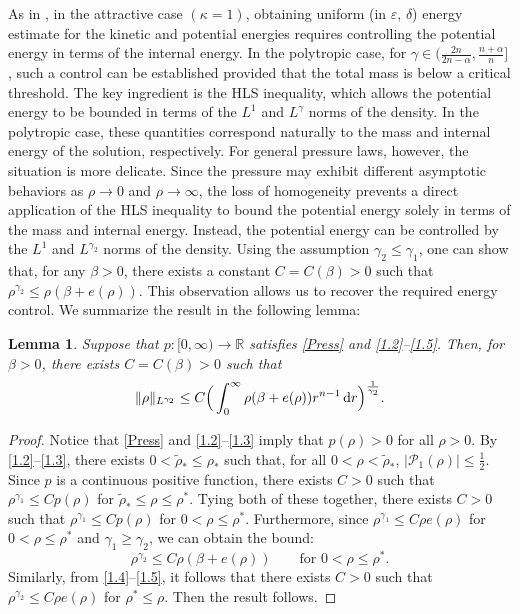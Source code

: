 \documentclass[reqno,11pt]{amsart}
\numberwithin{equation}{section}
\newtheorem{lemma}[theorem]{Lemma}
\theoremstyle{definition}
\def\dd{{\, \rm d}}
\begin{document}
As in \cite{Carrillo2025}, in the attractive case $(\kappa = 1)$, obtaining uniform (in $\varepsilon$, $\delta$) energy estimate for the kinetic and potential energies requires controlling the potential energy in terms of 
the internal energy. 
In the polytropic case, for $\gamma \in (\frac{2n}{2n -\alpha},\frac{n + \alpha}{n}]$, 
such a control can be established provided that the total mass is below a critical threshold.
The key ingredient is the HLS inequality, which allows the potential energy to be bounded in terms of the
$L^1$ and $L^\gamma$ norms of the density. 
In the polytropic case, these quantities correspond naturally to the mass and internal energy of the solution, respectively. 
For general pressure laws, however, the situation is more delicate.
Since the pressure may exhibit different asymptotic behaviors as $\rho \to 0$ and $\rho \to \infty$,
the loss of homogeneity prevents a direct application of the HLS inequality 
to bound the potential energy solely in terms of the mass and internal energy. 
Instead, the potential energy can be controlled by the $L^1$ and $L^{\gamma_2}$ norms of the density.
Using the assumption $\gamma_2\le \gamma_1$, one can show that, for any $\beta>0$, 
there exists a constant $C=C(\beta)>0$ such that $\rho^{\gamma_2} \leq \rho(\beta + e(\rho))$.
This observation allows us to recover the required energy control. 
We summarize the result in the following lemma:

\begin{lemma}\label{bigsmall}
Suppose that $p:[0,\infty) \to \mathbb{R}$ satisfies \eqref{Press} and \eqref{1.2}--\eqref{1.5}.
Then, for $\beta > 0$, there exists $C=C(\beta)>0$ such that
\begin{equation}\label{bigandsmallbehav}
\displaystyle
\| \rho \|_{L^{\gamma_2}} \leq C \Big ( \int^\infty_0 \rho (\beta + e(\rho)) r^{n-1} \dd r \Big )^\frac{1}{\gamma_2}. 
\end{equation}
\end{lemma}

\begin{proof}
Notice that \eqref{Press} and \eqref{1.2}--\eqref{1.3} imply that 
$p(\rho) > 0$ for all $\rho > 0$. 
By \eqref{1.2}--\eqref{1.3}, there exists $0< \tilde{\rho}_* \leq \rho_*$ such that, 
for all $0< \rho < \tilde{\rho}_*$, 
$|\mathcal{P}_1(\rho)| \leq \frac{1}{2}$. 
Since $p$ is a continuous positive function, 
there exists $C>0$ such that $\rho^{\gamma_1} \leq C p(\rho)$ for $\tilde{\rho}_* \leq \rho \leq \rho^*$. 
Tying both of these together, there exists $C>0$ such that $\rho^{\gamma_1} \leq C p(\rho)$ 
for $0 < \rho \leq \rho^*$. 
Furthermore, since $\rho^{\gamma_1} \leq C \rho e(\rho)$ for $0 < \rho \leq \rho^*$ 
and $\gamma_1 \geq \gamma_2$, we can obtain the bound: 
$$
\rho^{\gamma_2} \leq C\rho(\beta + e(\rho))\qquad
\mbox{for $0 < \rho \leq \rho^*$}. 
$$
Similarly, from \eqref{1.4}--\eqref{1.5}, it follows that there exists $C>0$ 
such that $\rho^{\gamma_2} \leq C \rho e(\rho)$ for $\rho^* \leq \rho$. 
Then the result follows.
\end{proof}
\end{document}

